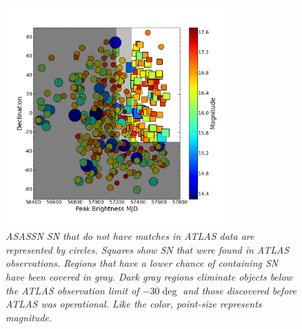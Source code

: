 \begin{figure}[H]%
  \begin{center}
\centerline{\includegraphics[width=3.35in]{figures/invert_mag.png}}
\caption{\it \small{ASASSN SN that do not have matches in ATLAS data are represented by circles. Squares show SN that were found in ATLAS observations. Regions that have a lower chance of containing SN have been covered in gray. Dark gray regions eliminate objects below the ATLAS observation limit of $-30\deg$ and those discovered before ATLAS was operational. Like the color, point-size represents magnitude.~\label{fig:dec_mjd}}}
  \end{center}
\end{figure}


